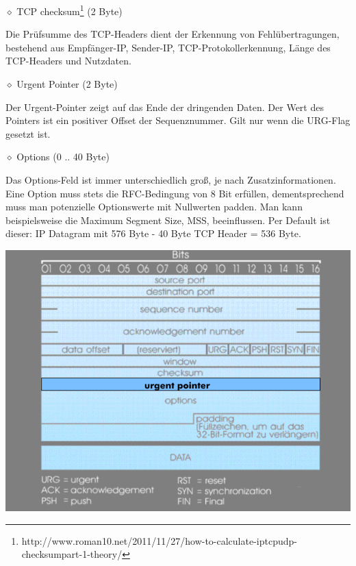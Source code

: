 \documentclass[11pt]{article}
\begin{document}
\begin{enumerate}[\thesection .1]
        $\diamond$ TCP checksum\footnote[1]{http://www.roman10.net/2011/11/27/how-to-calculate-iptcpudp-checksumpart-1-theory/} (2 Byte)
        \begin{addmargin}[1em]{1em}
            Die Prüfsumme des TCP-Headers dient der Erkennung von Fehlübertragungen, bestehend aus Empfänger-IP,
            Sender-IP, TCP-Protokollerkennung, Länge des TCP-Headers und Nutzdaten.
        \end{addmargin}

        $\diamond$ Urgent Pointer (2 Byte)
        \begin{addmargin}[1em]{1em}
            Der Urgent-Pointer zeigt auf das Ende der dringenden Daten. Der Wert des Pointers ist ein positiver Offset der Sequenznummer.
            Gilt nur wenn die URG-Flag gesetzt ist.
        \end{addmargin}

        $\diamond$ Options (0 .. 40 Byte)
        \begin{addmargin}[1em]{1em}
            Das Options-Feld ist immer unterschiedlich groß, je nach Zusatzinformationen.
            Eine Option muss stets die RFC-Bedingung von 8 Bit erfüllen, dementsprechend muss man potenzielle Optionswerte
            mit Nullwerten padden.
            Man kann beispielsweise die Maximum Segment Size, MSS, beeinflussen. Per Default ist dieser:
            IP Datagram mit 576 Byte - 40 Byte TCP Header = 536 Byte.
        \end{addmargin}

        \includegraphics[width=\textwidth]{TCP-Headerfield.png}


\end{enumerate}
\end{document}

